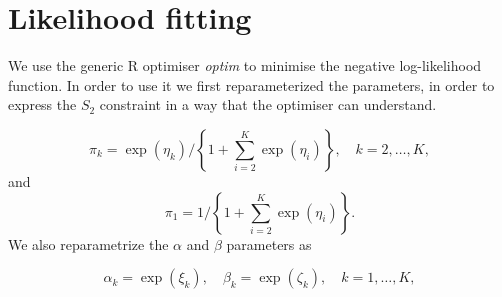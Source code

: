 \documentclass[10pt]{report}
\begin{document}
\section{Likelihood fitting}

We use the generic R optimiser \textit{optim} to minimise the negative log-likelihood function. In order to use it we first reparameterized the parameters, in order to express the $S_2$ constraint in a way that the optimiser can understand.

$$
\pi_k = \exp(\eta_k)/\left\{ 1+ \sum_{i=2}^K\exp(\eta_i)\right\}, \quad k=2,\ldots, K, 
$$
and 
$$
\pi_1 = 1/\left\{ 1+ \sum_{i=2}^K\exp(\eta_i)\right\}.
$$
We also reparametrize the $\alpha$ and $\beta$ parameters as

$$
\alpha_k = \exp(\xi_k), \quad \beta_k = \exp(\zeta_k), \quad k=1,\ldots,K,
$$
\end{document}
